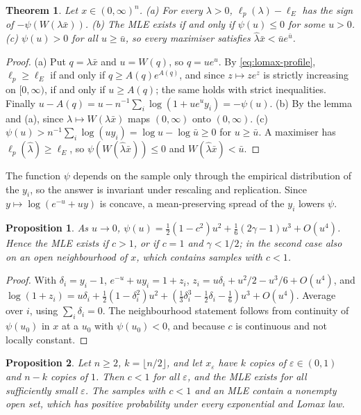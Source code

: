 \documentclass[11pt]{article}
\theoremstyle{plain}
\newtheorem{theorem}{Theorem}
\newtheorem{proposition}{Proposition}
\theoremstyle{definition}
\theoremstyle{remark}
\begin{document}
\begin{theorem}\label{thm:lomax}
Let $x\in(0,\infty)^n$.
(a) For every $\lambda>0$, $\ell_p(\lambda)-\ell_E$ has the sign of
$-\psi(W(\lambda\bar x))$.
(b) The MLE exists if and only if $\psi(u)\le0$ for some $u>0$.
(c) $\psi(u)>0$ for all $u\ge\bar u$, so every maximiser satisfies
$\hat\lambda\bar x < \bar u e^{\bar u}$.
\end{theorem}

\begin{proof}
(a) Put $q = \lambda\bar x$ and $u = W(q)$, so $q = ue^u$. By
\eqref{eq:lomax-profile}, $\ell_p\ge\ell_E$ if and only if
$q\ge A(q)e^{A(q)}$, and since $z\mapsto ze^z$ is strictly increasing on
$[0,\infty)$, if and only if $u\ge A(q)$; the same holds with strict
inequalities. Finally
$u - A(q) = u - n^{-1}\sum_i\log(1+ue^uy_i) = -\psi(u)$.
(b) By the lemma and (a), since $\lambda\mapsto W(\lambda\bar x)$ maps
$(0,\infty)$ onto $(0,\infty)$.
(c) $\psi(u) > n^{-1}\sum_i\log(uy_i) = \log u - \log\bar u\ge0$ for
$u\ge\bar u$. A maximiser has $\ell_p(\hat\lambda)\ge\ell_E$, so
$\psi(W(\hat\lambda\bar x))\le0$ and $W(\hat\lambda\bar x)<\bar u$.
\end{proof}

The function $\psi$ depends on the sample only through the empirical distribution of the
$y_i$, so the answer is invariant under rescaling and replication. Since
$y\mapsto\log(e^{-u}+uy)$ is concave, a mean-preserving spread of the $y_i$
lowers $\psi$.

\begin{proposition}\label{prop:lomax-expansion}
As $u\to0$, $\psi(u) = \tfrac12(1-c^2)u^2 + \tfrac16(2\gamma-1)u^3 + O(u^4)$.
Hence the MLE exists if $c>1$, or if $c=1$ and $\gamma<1/2$; in the second
case also on an open neighbourhood of $x$, which contains samples with $c<1$.
\end{proposition}

\begin{proof}
With $\delta_i = y_i - 1$, $e^{-u}+uy_i = 1+z_i$,
$z_i = u\delta_i + u^2/2 - u^3/6 + O(u^4)$, and
$\log(1+z_i) = u\delta_i + \tfrac12(1-\delta_i^2)u^2
+ (\tfrac13\delta_i^3 - \tfrac12\delta_i - \tfrac16)u^3 + O(u^4)$. Average
over $i$, using $\sum_i\delta_i = 0$. The neighbourhood statement follows
from continuity of $\psi(u_0)$ in $x$ at a $u_0$ with $\psi(u_0)<0$, and
because $c$ is continuous and not locally constant.
\end{proof}

\begin{proposition}\label{prop:lomax-counter}
Let $n\ge2$, $k = \lfloor n/2\rfloor$, and let $x_\varepsilon$ have $k$
copies of $\varepsilon\in(0,1)$ and $n-k$ copies of $1$. Then $c<1$ for all
$\varepsilon$, and the MLE exists for all sufficiently small $\varepsilon$.
The samples with $c<1$ and an MLE contain a nonempty open set, which has
positive probability under every exponential and Lomax law.
\end{proposition}
\end{document}
